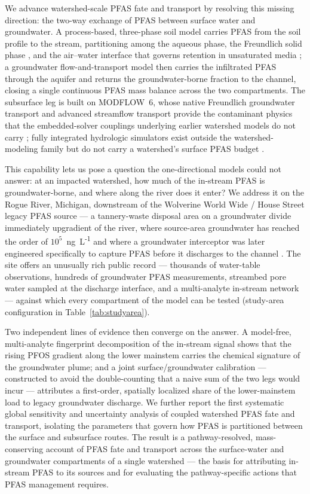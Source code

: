We advance watershed-scale PFAS fate and transport by resolving this missing direction: the two-way
exchange of PFAS between surface water and groundwater. A process-based, three-phase soil model carries
PFAS from the soil profile to the stream, partitioning among the aqueous phase, the Freundlich solid
phase \citep{higgins_luthy2006}, and the air--water interface that governs retention in unsaturated
media \citep{costanza2019, brusseau2018, guo2020}; a groundwater flow-and-transport model then carries
the infiltrated PFAS through the aquifer and returns the groundwater-borne fraction to the channel,
closing a single continuous PFAS mass balance across the two compartments. The subsurface leg is built
on MODFLOW~6, whose native Freundlich groundwater transport and advanced streamflow transport
\citep{langevin2017mf6, morway2021gwt} provide the contaminant physics that the embedded-solver
couplings underlying earlier watershed models do not carry \citep{bailey2016swatmodflow,
bailey2025swatplusmodflow}; fully integrated hydrologic simulators exist outside the watershed-modeling
family but do not carry a watershed's surface PFAS budget \citep{markstrom2008gsflow, brunner2012hgs}.

This capability lets us pose a question the one-directional models could not answer: at an impacted
watershed, how much of the in-stream PFAS is groundwater-borne, and where along the river does it enter?
We address it on the Rogue River, Michigan, downstream of the Wolverine World Wide / House Street legacy
PFAS source --- a tannery-waste disposal area on a groundwater divide immediately upgradient of the
river, where source-area groundwater has reached the order of $10^{5}$~ng~L\textsuperscript{-1} and
where a groundwater interceptor was later engineered specifically to capture PFAS before it discharges
to the channel \citep{epa_wolverine, egle_housestreet, egle_rrt5_2021}. The site offers an unusually
rich public record --- thousands of water-table observations, hundreds of groundwater PFAS
measurements, streambed pore water sampled at the discharge interface, and a multi-analyte in-stream
network \citep{egle_grandriver2019, lemke2024} --- against which every compartment of the model can be
tested (study-area configuration in Table~\ref{tab:studyarea}).

Two independent lines of evidence then converge on the answer. A model-free, multi-analyte fingerprint
decomposition of the in-stream signal shows that the rising PFOS gradient along the lower mainstem
carries the chemical signature of the groundwater plume; and a joint surface/groundwater calibration ---
constructed to avoid the double-counting that a naive sum of the two legs would incur --- attributes a
first-order, spatially localized share of the lower-mainstem load to legacy groundwater discharge. We
further report the first systematic global sensitivity and uncertainty analysis of coupled watershed
PFAS fate and transport, isolating the parameters that govern how PFAS is partitioned between the
surface and subsurface routes. The result is a pathway-resolved, mass-conserving account of PFAS fate
and transport across the surface-water and groundwater compartments of a single watershed --- the basis
for attributing in-stream PFAS to its sources and for evaluating the pathway-specific actions that PFAS
management requires.
